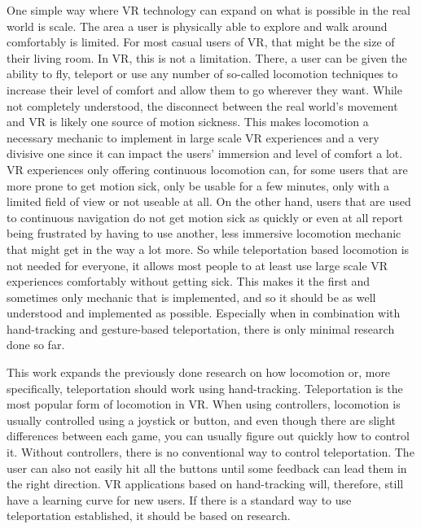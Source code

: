 One simple way where VR technology can expand on what is possible in the real world is scale. The area a user is physically able to explore and walk around comfortably is limited. For most casual users of VR, that might be the size of their living room. In VR, this is not a limitation. There, a user can be given the ability to fly, teleport or use any number of so-called locomotion techniques to increase their level of comfort and allow them to go wherever they want. While not completely understood, the disconnect between the real world's movement and VR is likely one source of motion sickness. This makes locomotion a necessary mechanic to implement in large scale VR experiences and a very divisive one since it can impact the users' immersion and level of comfort a lot. VR experiences only offering continuous locomotion can, for some users that are more prone to get motion sick, only be usable for a few minutes, only with a limited field of view or not useable at all. On the other hand, users that are used to continuous navigation do not get motion sick as quickly or even at all report being frustrated by having to use another, less immersive locomotion mechanic that might get in the way a lot more. So while teleportation based locomotion is not needed for everyone, it allows most people to at least use large scale VR experiences comfortably without getting sick. This makes it the first and sometimes only mechanic that is implemented, and so it should be as well understood and implemented as possible. Especially when in combination with hand-tracking and gesture-based teleportation, there is only minimal research done so far.

This work expands the previously done research on how locomotion or, more specifically, teleportation should work using hand-tracking. Teleportation is the most popular form of locomotion in VR. When using controllers, locomotion is usually controlled using a joystick or button, and even though there are slight differences between each game, you can usually figure out quickly how to control it. Without controllers, there is no conventional way to control teleportation. The user can also not easily hit all the buttons until some feedback can lead them in the right direction. VR applications based on hand-tracking will, therefore, still have a learning curve for new users. If there is a standard way to use teleportation established, it should be based on research. 







